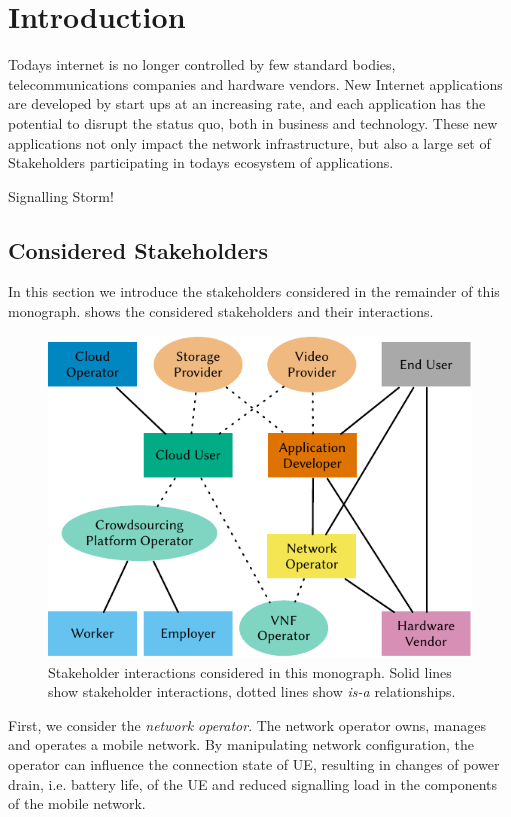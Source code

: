 \chapter{Introduction}\label{chap:introduction}

Todays internet is no longer controlled by few standard bodies, telecommunications companies and hardware vendors. 
New Internet applications are developed by start ups at an increasing rate, and each application has the potential to disrupt the status quo, both in business and technology.
These new applications not only impact the network infrastructure, but also a large set of Stakeholders participating in todays ecosystem of applications.

Signalling Storm!

\section{Considered Stakeholders}

In this section we introduce the stakeholders considered in the remainder of this monograph.
 shows the considered stakeholders and their interactions.

\begin{figure}
\centering
\includegraphics{figures/stakeholders}
\caption{Stakeholder interactions considered in this monograph. Solid lines show stakeholder interactions, dotted lines show \emph{is-a} relationships.}\label{fig:introduction:stakeholders}
\end{figure}

First, we consider the \emph{network operator}.
The network operator owns, manages and operates a mobile network.
By manipulating network configuration, the operator can influence the connection state of \gls{UE}, resulting in changes of power drain, i.e. battery life, of the \gls{UE} and reduced signalling load in the components of the mobile network.

